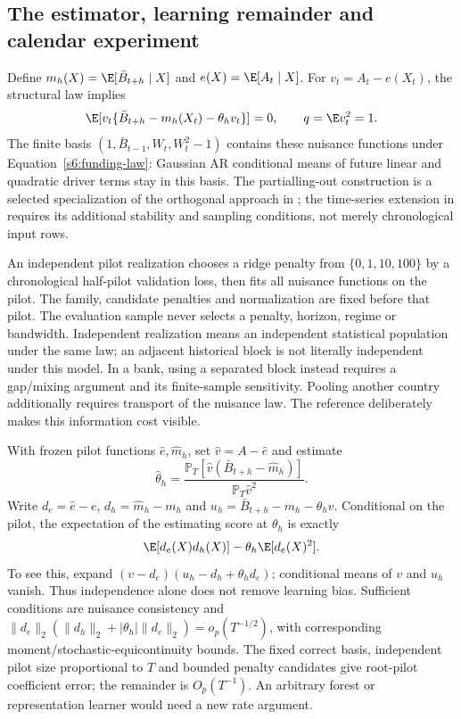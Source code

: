 \subsection{The estimator, learning remainder and calendar experiment}
Define $m_h(X)=\E[\bar B_{t+h}\mid X]$ and $e(X)=\E[A_t\mid X]$.
For $v_t=A_t-e(X_t)$, the structural law implies
\[
 \E[v_t\{\bar B_{t+h}-m_h(X_t)-\theta_hv_t\}]=0,
 \qquad q=\E v_t^2=1.
\]
The finite basis $(1,\bar B_{t-1},W_t,W_t^2-1)$ contains these nuisance
functions under Equation~\eqref{s6:funding-law}: Gaussian AR conditional
means of future linear and quadratic driver terms stay in this basis.
The partialling-out construction is a selected specialization of the
orthogonal approach in \citet{dml2018}; the time-series extension in
\citet{ciganovic2026} requires its additional stability and sampling
conditions, not merely chronological input rows.

An independent pilot realization chooses a ridge penalty from
$\{0,1,10,100\}$ by a chronological half-pilot validation loss, then fits
all nuisance functions on the pilot. The family, candidate penalties and
normalization are fixed before that pilot. The evaluation sample never
selects a penalty, horizon, regime or bandwidth. Independent realization
means an independent statistical population under the same law; an adjacent
historical block is not literally independent under this model. In a bank,
using a separated block instead requires a gap/mixing argument and its
finite-sample sensitivity. Pooling another country additionally requires
transport of the nuisance law. The reference deliberately makes this
information cost visible.

With frozen pilot functions $\hat e,\hat m_h$, set
$\hat v=A-\hat e$ and estimate
\[
 \hat\theta_h=
 \frac{\mathbb P_T[\hat v(\bar B_{t+h}-\hat m_h)]}
      {\mathbb P_T\hat v^2}.
\]
Write $d_e=\hat e-e$, $d_h=\hat m_h-m_h$ and
$u_h=\bar B_{t+h}-m_h-\theta_hv$. Conditional on the pilot, the
expectation of the estimating score at $\theta_h$ is exactly
\begin{equation}
 \E[d_e(X)d_h(X)]-\theta_h\E[d_e(X)^2].
 \label{s6:pilot-remainder}
\end{equation}
To see this, expand
$(v-d_e)(u_h-d_h+\theta_hd_e)$; conditional means of $v$ and $u_h$
vanish. Thus independence alone does not remove learning bias. Sufficient
conditions are nuisance consistency and
$\|d_e\|_2(\|d_h\|_2+|\theta_h|\|d_e\|_2)=o_p(T^{-1/2})$,
with corresponding moment/stochastic-equicontinuity bounds. The fixed
correct basis, independent pilot size proportional to $T$ and bounded
penalty candidates give root-pilot coefficient error; the remainder is
$O_p(T^{-1})$. An arbitrary forest or representation learner would need
a new rate argument.

